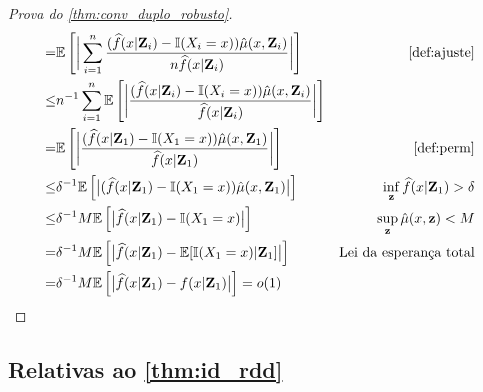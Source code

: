 \begin{proof}[Prova do \cref{thm:conv_duplo_robusto}]
\begin{align*}
  =& \E\left[\bigg|\sum_{i=1}^n 
  \frac{(\hf(x|\Z_i)-\I(X_i=x))
  \hat{\mu}(x,\Z_i)}
  {n\hf(x|\Z_i)}\bigg|\right]
  & \text{\cref{def:ajuste}} \\
  \leq& n^{-1}\sum_{i=1}^n\E\left[\bigg| 
  \frac{(\hf(x|\Z_i)-\I(X_i=x))
  \hat{\mu}(x,\Z_i)}
  {\hf(x|\Z_i)}\bigg|\right] \\
  =& \E\left[\bigg| 
  \frac{(\hf(x|\Z_1)-\I(X_1=x))
  \hat{\mu}(x,\Z_1)}
  {\hf(x|\Z_1)}\bigg|\right] 
  & \text{\cref{def:perm}} \\
  \leq& \delta^{-1} \E\left[\big| 
  (\hf(x|\Z_1)-\I(X_1=x))
  \hat{\mu}(x,\Z_1)\big|\right] 
  & \inf_\z \hf(x|\Z_1) > \delta \\
  \leq& \delta^{-1}M \E\left[\big| 
  \hf(x|\Z_1)-\I(X_1=x)\big|\right] 
  & \sup_\z \hat{\mu}(x,\z) < M \\
  =& \delta^{-1}M \E\left[\big| 
  \hf(x|\Z_1)-\E[\I(X_1=x)|\Z_1]\big|\right] 
  & \text{Lei da esperança total} \\
  =& \delta^{-1}M \E\left[\big| 
  \hf(x|\Z_1)-f(x|\Z_1)\big|\right]
  = o(1)
 \end{align*}
\end{proof}

\subsection{Relativas ao \cref{thm:id_rdd}}

